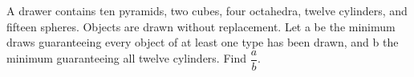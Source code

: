 A drawer contains ten pyramids, two cubes, four octahedra, twelve cylinders, and fifteen spheres. Objects are drawn without replacement. Let a be the minimum draws guaranteeing every object of at least one type has been drawn, and b the minimum guaranteeing all twelve cylinders. Find $\dfrac{a}{b}$.
